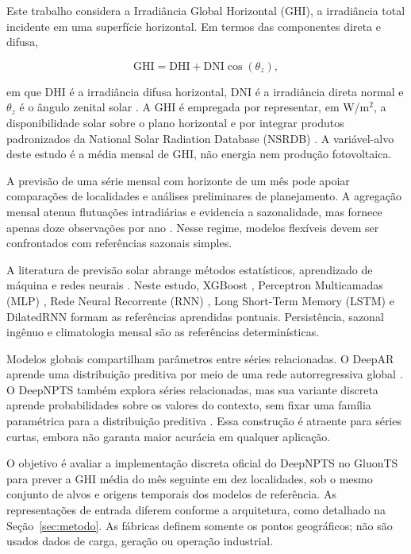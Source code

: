 \documentclass[10pt,conference,a4paper]{IEEEtran}
\begin{document}
Este trabalho considera a Irradiância Global Horizontal (GHI), a irradiância
total incidente em uma superfície horizontal. Em termos das componentes direta
e difusa,

\begin{equation}
  \mathrm{GHI}=\mathrm{DHI}+\mathrm{DNI}\cos(\theta_z),
  \label{eq:ghi}
\end{equation}

\noindent em que DHI é a irradiância difusa horizontal, DNI é a irradiância
direta normal e $\theta_z$ é o ângulo zenital solar \cite{duffie2013}. A GHI é
empregada por representar, em W/m$^2$, a disponibilidade solar sobre o plano
horizontal e por integrar produtos padronizados da National Solar Radiation
Database (NSRDB) \cite{sengupta2018}. A variável-alvo deste estudo é a média
mensal de GHI, não energia nem produção fotovoltaica.

A previsão de uma série mensal com horizonte de um mês pode apoiar comparações
de localidades e análises preliminares de planejamento. A agregação mensal
atenua flutuações intradiárias e evidencia a sazonalidade, mas fornece apenas
doze observações por ano \cite{antonanzas2016,voyant2022}. Nesse regime,
modelos flexíveis devem ser confrontados com referências sazonais simples.

A literatura de previsão solar abrange métodos estatísticos, aprendizado de
máquina e redes neurais \cite{voyant2017,sobri2018}. Neste estudo, XGBoost
\cite{chen2016}, Perceptron Multicamadas (MLP) \cite{hornik1989}, Rede Neural
Recorrente (RNN) \cite{elman1990}, Long Short-Term Memory (LSTM)
\cite{hochreiter1997} e DilatedRNN \cite{chang2017} formam as referências
aprendidas pontuais. Persistência, sazonal ingênuo e climatologia mensal são as
referências determinísticas.

Modelos globais compartilham parâmetros entre séries relacionadas. O DeepAR
aprende uma distribuição preditiva por meio de uma rede autorregressiva global
\cite{salinas2020}. O DeepNPTS também explora séries relacionadas, mas sua
variante discreta aprende probabilidades sobre os valores do contexto, sem
fixar uma família paramétrica para a distribuição preditiva
\cite{rangapuram2023}. Essa construção é atraente para séries curtas, embora
não garanta maior acurácia em qualquer aplicação.

O objetivo é avaliar a implementação discreta oficial do DeepNPTS no GluonTS
\cite{alexandrov2020} para prever a GHI média do mês seguinte em dez
localidades, sob o mesmo conjunto de alvos e origens temporais dos modelos de
referência. As representações de entrada diferem conforme a arquitetura, como
detalhado na Seção~\ref{sec:metodo}. As fábricas definem somente os pontos
geográficos; não são usados dados de carga, geração ou operação industrial.
\end{document}

